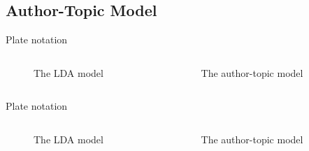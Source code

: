 \subsection{Author-Topic Model}

\begin{frame}{\insertsubsection}{Plate notation}
	\begin{columns}
		\begin{column}{0.45\textwidth}
			\begin{figure}
				\resizebox{\textwidth}{!}{%
				
			}
			\caption*{The LDA model}
			\end{figure}
		\end{column}
		\begin{column}{0.45\textwidth}
			\begin{figure}
				\resizebox{\textwidth}{!}{%
					
				}
				\caption*{The author-topic model}
			\end{figure}
		\end{column}
	\end{columns}
\end{frame}

\begin{frame}{\insertsubsection}{Plate notation}
		\begin{columns}
		\begin{column}{0.38\textwidth}
			\begin{figure}
				\resizebox{\textwidth}{!}{%
					
				}
				\caption*{The LDA model}
			\end{figure}
		\end{column}
		\begin{column}{0.52\textwidth}
			\begin{figure}
				\resizebox{\textwidth}{!}{%
					
				}
				\caption*{The author-topic model}
			\end{figure}
		\end{column}
	\end{columns}
\end{frame}


